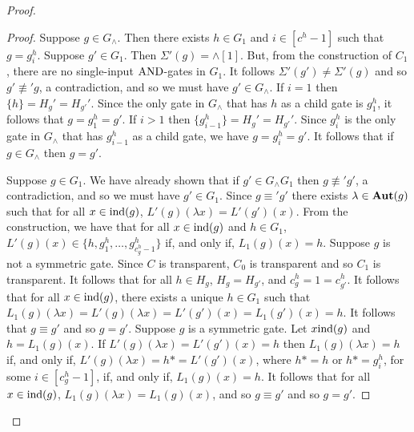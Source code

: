 \documentclass[../paper.tex]{subfiles}
\begin{document}
\begin{proof}
\begin{proof}
    
    Suppose $g \in G_{\land}$. Then there exists $h \in G_1$ and $i \in [c^h -
    1]$ such that $g = g^h_i$. Suppose $g' \in G_1$. Then $\Sigma'(g) =
    \land[1]$. But, from the construction of $C_1$, there are no single-input
    $\text{\upshape AND}$-gates in $G_1$. It follows $\Sigma'(g') \neq \Sigma'(g)$ and so $g'
    \not\equiv' g$, a contradiction, and so we must have $g' \in G_{\land}$. If
    $i = 1$ then $\{ h \} = H_g' = H_{g'}'$. Since the only gate in $G_\land$
    that has $h$ as a child gate is $g^h_1$, it follows that $g = g^h_1 = g'$.
    If $i > 1$ then $\{g^{h}_{i-1}\} = H_g' = H_{g'}'$. Since $g^h_i$ is the
    only gate in $G_\land$ that has $g^h_{i-1}$ as a child gate, we have $g =
    g^h_i = g'$. It follows that if $g \in G_\land$ then $g = g'$.

    Suppose $g \in G_1$. We have already shown that if $g' \in G_\land G_1$ then
    $g \not\equiv' g'$, a contradiction, and so we must have $g' \in G_1$. Since
    $g \equiv' g'$ there exists $\lambda \in \text{\textbf{Aut}}(g)$ such that for all $x \in
    \text{\upshape ind}(g)$, $L'(g)(\lambda x) = L'(g')(x)$. From the construction, we have
    that for all $x \in \text{\upshape ind}(g)$ and $h \in G_1$, $L'(g)(x) \in \{h, g^h_1 ,
    \ldots, g^h_{c^h_g -1}\}$ if, and only if, $L_1(g)(x) = h$. Suppose $g$ is
    not a symmetric gate. Since $C$ is transparent, $C_0$ is transparent and so
    $C_1$ is transparent. It follows that for all $h \in H_g$, $H_g = H_{g'}$,
    and $c^h_g = 1 = c^h_{g'}$. It follows that for all $x \in \text{\upshape ind}(g)$, there
    exists a unique $h \in G_1$ such that $L_1(g)(\lambda x) = L'(g)(\lambda x)
    = L'(g')(x) = L_1 (g')(x) = h$. It follows that $g \equiv g'$ and so $g =
    g'$. Suppose $g$ is a symmetric gate. Let $x \text{\upshape ind}(g)$ and $h = L_1(g)(x)$.
    If $L'(g)(\lambda x) = L'(g')(x)= h$ then $L_1(g)(\lambda x) = h$ if, and
    only if, $L'(g)(\lambda x ) = h* = L'(g')(x)$, where $h* = h$ or $h* =
    g^{h}_i$, for some $i \in [c^h_g -1]$, if, and only if, $L_1(g) (x) = h$. It
    follows that for all $x \in \text{\upshape ind}(g)$, $L_1 (g) (\lambda x) = L_1 (g)(x)$,
    and so $g \equiv g'$ and so $g = g'$.

    

\end{proof}
\end{proof}
\end{document}
